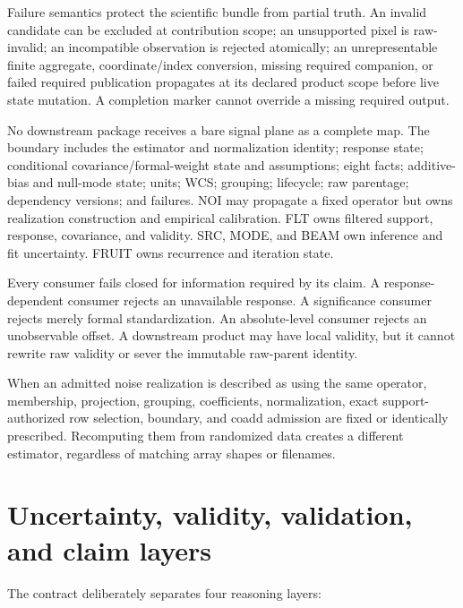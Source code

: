 \documentclass[10pt]{article}
\begin{document}
Failure semantics protect the scientific bundle from partial truth. An
invalid candidate can be excluded at contribution scope; an unsupported pixel
is raw-invalid; an incompatible observation is rejected atomically; an
unrepresentable finite aggregate, coordinate/index conversion, missing
required companion, or failed required publication propagates at its declared
product scope before live state mutation. A completion marker cannot override
a missing required output.

No downstream package receives a bare signal plane as a complete map. The
boundary includes the estimator and normalization identity; response state;
conditional covariance/formal-weight state and assumptions; eight facts;
additive-bias and null-mode state; units; WCS; grouping; lifecycle; raw
parentage; dependency versions; and failures. NOI may propagate a fixed
operator but owns realization construction and empirical calibration. FLT
owns filtered support, response, covariance, and validity. SRC, MODE, and BEAM
own inference and fit uncertainty. FRUIT owns recurrence and iteration state.

Every consumer fails closed for information required by its claim. A response-
dependent consumer rejects an unavailable response. A significance consumer
rejects merely formal standardization. An absolute-level consumer rejects an
unobservable offset. A downstream product may have local validity, but it
cannot rewrite raw validity or sever the immutable raw-parent identity.

When an admitted noise realization is described as using the same operator,
membership, projection, grouping, coefficients, normalization, exact
support-authorized row selection, boundary, and coadd admission are fixed or
identically prescribed. Recomputing them from randomized data creates a
different estimator, regardless of matching array shapes or filenames.

\clearpage
\section{Uncertainty, validity, validation, and claim layers}

The contract deliberately separates four reasoning layers:
\end{document}
